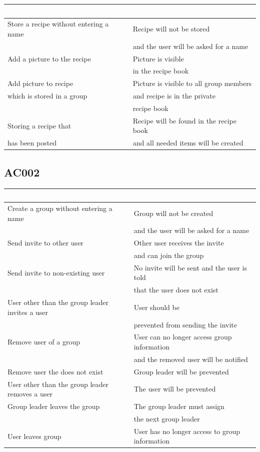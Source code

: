 \documentclass[12pt]{article}
\theoremstyle{definition}
\begin{document}
\begin{tabular}{|l|l|}
\hline 
\cellcolor[gray]{0.5}\textcolor{white}{Test step} & \cellcolor[gray]{0.5}\textcolor{white}{Expected behaviour} \\ \hline
Store a recipe without entering a name & Recipe will not be stored \\ 
 & and the user will be asked for a name \\ \hline
Add a picture to the recipe & Picture is visible \\
 & in the recipe book \\ \hline
Add picture to recipe & Picture is visible to all group members\\
which is stored in a group & and recipe is in the private \\ 
& recipe book \\ \hline
Storing a recipe that & Recipe will be found in the recipe book\\
has been posted & and all needed items will be created\\ \hline
\end{tabular}


\subsection{AC002}

\begin{tabular}{|l|l|}
\hline
\cellcolor[gray]{0.5}\textcolor{white}{Test step} & \cellcolor[gray]{0.5}\textcolor{white}{Expected behaviour} \\ \hline
Create a group without entering a name & Group will not be created \\ 
 & and the user will be asked for a name \\ \hline
Send invite to other user & Other user receives the invite \\
& and can join the group \\ \hline
Send invite to non-existing user & No invite will be sent and the user is told \\
& that the user does not exist \\ \hline
User other than the group leader invites a user & User should be \\ & prevented from sending the invite \\ \hline
Remove user of a group & User can no longer access group information \\
& and the removed user will be notified \\ \hline
Remove user the does not exist & Group leader will be prevented\\ \hline
User other than the group leader removes a user & The user will be prevented \\ \hline
Group leader leaves the group & The group leader must assign \\
& the next group leader \\ \hline
User leaves group & User has no longer access to group information \\ \hline
\end{tabular}
\end{document}
